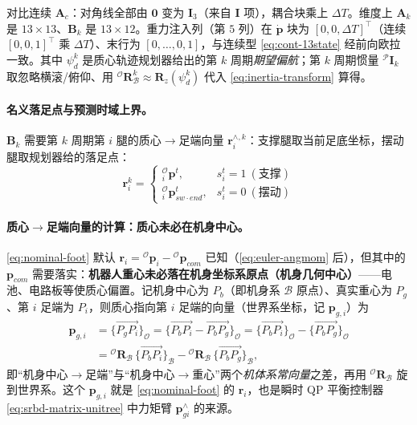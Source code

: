 对比连续 $\mathbf{A}_c$：对角线全部由 $\mathbf{0}$ 变为 $\mathbf{I}_3$（来自 $\mathbf{I}$ 项），耦合块乘上 $\Delta T$。维度上 $\mathbf{A}_k$ 是 $13\times13$、$\mathbf{B}_k$ 是 $13\times12$。重力注入列（第 $5$ 列）在 $\dot{\boldsymbol{p}}$ 块为 $[0,0,\Delta T]^\top$（连续 $[0,0,1]^\top$ 乘 $\Delta T$）、末行为 $[0,\dots,0,1]$，与连续型 \cref{eq:cont-13state} 经前向欧拉一致。其中 $\psi_d^k$ 是质心轨迹规划器给出的第 $k$ 周期\emph{期望偏航}；第 $k$ 周期惯量 ${}^{\mathcal{P}}\mathbf{I}_k$ 取忽略横滚/俯仰、用 ${}^{\mathcal{O}}\mathbf{R}_{\mathcal{B}}^k\approx\mathbf{R}_z(\psi_d^k)$ 代入 \cref{eq:inertia-transform} 算得。

\paragraph{名义落足点与预测时域上界。}
$\mathbf{B}_k$ 需要第 $k$ 周期第 $i$ 腿的质心$\to$足端向量 $\boldsymbol{r}_i^{\wedge,k}$：支撑腿取当前足底坐标，摆动腿取规划器给的落足点\cite{yu2021quadruped}：
\begin{equation}
  \boldsymbol{r}_{i}^{k}=\begin{cases} {}_i^{\mathcal{O}}\boldsymbol{p}^{t}, & s_i^{t}=1\ (\text{支撑}) \\ {}_i^{\mathcal{O}}\boldsymbol{p}_{sw\cdot end}^{t}, & s_i^{t}=0\ (\text{摆动}) \end{cases}
  \label{eq:nominal-foot}
\end{equation}

\paragraph{质心$\to$足端向量的计算：质心未必在机身中心。}
\cref{eq:nominal-foot} 默认 $\boldsymbol{r}_i={}^{\mathcal{O}}\boldsymbol{p}_i-{}^{\mathcal{O}}\boldsymbol{p}_{com}$ 已知（\cref{eq:euler-angmom} 后），但其中的 $\boldsymbol{p}_{com}$ 需要落实：\textbf{机器人重心未必落在机身坐标系原点（机身几何中心）}——电池、电路板等使质心偏置。记机身中心为 $P_b$（即机身系 $\mathcal{B}$ 原点）、真实重心为 $P_g$、第 $i$ 足端为 $P_i$，则质心指向第 $i$ 足端的向量（世界系坐标，记 $\boldsymbol{p}_{g,i}$）为\cite{unitree2023quadruped}
\begin{equation}
\begin{aligned}
  \boldsymbol{p}_{g,i}&=\{\overrightarrow{P_gP_i}\}_{\mathcal{O}}=\{\overrightarrow{P_bP_i}-\overrightarrow{P_bP_g}\}_{\mathcal{O}}
  =\{\overrightarrow{P_bP_i}\}_{\mathcal{O}}-\{\overrightarrow{P_bP_g}\}_{\mathcal{O}}\\
  &={}^{\mathcal{O}}\mathbf{R}_{\mathcal{B}}\,\{\overrightarrow{P_bP_i}\}_{\mathcal{B}}-{}^{\mathcal{O}}\mathbf{R}_{\mathcal{B}}\,\{\overrightarrow{P_bP_g}\}_{\mathcal{B}},
\end{aligned}
\label{eq:com-to-foot}
\end{equation}
即“机身中心$\to$足端”与“机身中心$\to$重心”两个\emph{机体系常向量}之差，再用 ${}^{\mathcal{O}}\mathbf{R}_{\mathcal{B}}$ 旋到世界系。这个 $\boldsymbol{p}_{g,i}$ 就是 \cref{eq:nominal-foot} 的 $\boldsymbol{r}_i$，也是瞬时 QP 平衡控制器 \cref{eq:srbd-matrix-unitree} 中力矩臂 $\boldsymbol{p}_{gi}^{\wedge}$ 的来源。

